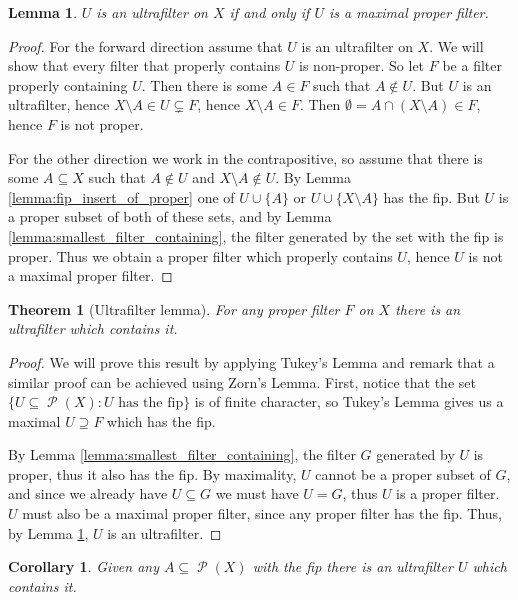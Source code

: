 \documentclass[leqno]{article}
\newtheorem{theorem}{Theorem}[section]
\newtheorem{lemma}{Lemma}[section]
\newtheorem{corollary}{Corollary}[theorem]
\theoremstyle{remark}
\newcommand{\paren}[1]{\left( #1 \right)}
\newcommand{\set}[1]{\{#1\}}
\newcommand{\powerset}[1]{\operatorname{\mathcal{P}}\paren{#1}}
\begin{document}
\begin{lemma} \label{lemma:ultrafilter_iff}
    $U$ is an ultrafilter on $X$ if and only if $U$ is a maximal proper filter.
\end{lemma}

\begin{proof}
    For the forward direction assume that $U$ is an ultrafilter on $X$. We will show that every filter that properly contains $U$ is non-proper. So let $F$ be a filter properly containing $U$. Then there is some $A \in F$ such that $A \notin U$. But $U$ is an ultrafilter, hence $X \setminus A \in U \subsetneq F$, hence $X \setminus A \in F$. Then $\emptyset = A \cap (X \setminus A) \in F$, hence $F$ is not proper.
    
    For the other direction we work in the contrapositive, so assume that there is some $A \subseteq X$ such that $A \notin U$ and $X \setminus A \notin U$. By Lemma \ref{lemma:fip_insert_of_proper} one of $U \cup \set{A}$ or $U \cup \set{X \setminus A}$ has the fip. But $U$ is a proper subset of both of these sets, and by Lemma \ref{lemma:smallest_filter_containing}, the filter generated by the set with the fip is proper. Thus we obtain a proper filter which properly contains $U$, hence $U$ is not a maximal proper filter.
\end{proof}

\begin{theorem}[Ultrafilter lemma] \label{thm:ultrafilter_of_proper_filter}
    For any proper filter $F$ on $X$ there is an ultrafilter which contains it.
\end{theorem}

\begin{proof}
    We will prove this result by applying Tukey's Lemma and remark that a similar proof can be achieved using Zorn's Lemma. First, notice that the set $\set{U \subseteq \powerset{X} : \text{$U$ has the fip}}$ is of finite character, so Tukey's Lemma gives us a maximal $U \supseteq F$ which has the fip. 
    
    By Lemma \ref{lemma:smallest_filter_containing}, the filter $G$ generated by $U$ is proper, thus it also has the fip. By maximality, $U$ cannot be a proper subset of $G$, and since we already have $U \subseteq G$ we must have $U = G$, thus $U$ is a proper filter. $U$ must also be a maximal proper filter, since any proper filter has the fip. Thus, by Lemma \ref{lemma:ultrafilter_iff}, $U$ is an ultrafilter.
\end{proof}

\begin{corollary} \label{col:ultrafilter_of_fip}
    Given any $A \subseteq \powerset{X}$ with the fip there is an ultrafilter $U$ which contains it.
\end{corollary}
\end{document}

